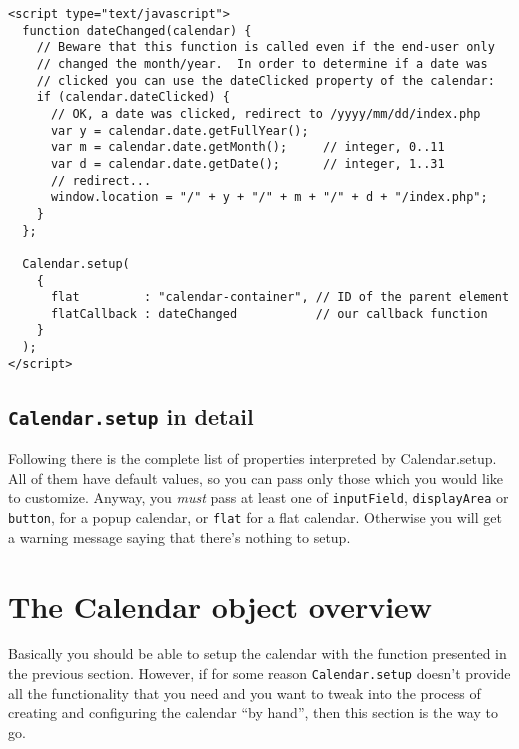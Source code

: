 \documentclass[a4paper,10pt]{article}
\begin{document}
\begin{verbatim}
<script type="text/javascript">
  function dateChanged(calendar) {
    // Beware that this function is called even if the end-user only
    // changed the month/year.  In order to determine if a date was
    // clicked you can use the dateClicked property of the calendar:
    if (calendar.dateClicked) {
      // OK, a date was clicked, redirect to /yyyy/mm/dd/index.php
      var y = calendar.date.getFullYear();
      var m = calendar.date.getMonth();     // integer, 0..11
      var d = calendar.date.getDate();      // integer, 1..31
      // redirect...
      window.location = "/" + y + "/" + m + "/" + d + "/index.php";
    }
  };

  Calendar.setup(
    {
      flat         : "calendar-container", // ID of the parent element
      flatCallback : dateChanged           // our callback function
    }
  );
</script>
\end{verbatim}

\subsection{\texttt{Calendar.setup} in detail}\label{sec:Calendar.setup}

Following there is the complete list of properties interpreted by
Calendar.setup.  All of them have default values, so you can pass only those
which you would like to customize.  Anyway, you \emph{must} pass at least one
of \texttt{inputField}, \texttt{displayArea} or \texttt{button}, for a popup
calendar, or \texttt{flat} for a flat calendar.  Otherwise you will get a
warning message saying that there's nothing to setup.

\begin{small}
\ifx\shipout\undefined

\else
{}
\fi
\end{small}




\section{The Calendar object overview}\label{sec:Calendar_overview}

Basically you should be able to setup the calendar with the function presented
in the previous section.  However, if for some reason \texttt{Calendar.setup}
doesn't provide all the functionality that you need and you want to tweak into
the process of creating and configuring the calendar ``by hand'', then this
section is the way to go.
\end{document}
